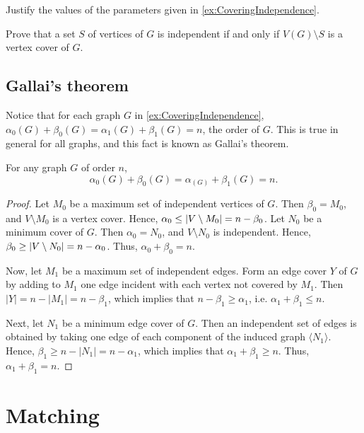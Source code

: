 \begin{Exercise}
Justify the values of the parameters given in \cref{ex:CoveringIndependence}.
\end{Exercise}

\begin{Exercise}
Prove that a set $S$ of vertices of $G$ is independent if and only if $V(G) \setminus S$ is a vertex cover of $G$.
\end{Exercise}

\subsection*{Gallai's theorem}
Notice that for each graph $G$ in \cref{ex:CoveringIndependence}, $\alpha_0(G) + \beta_0(G) = \alpha_1(G) + \beta_1(G) = n$, the order of $G$. This is true in general for all graphs, and this fact is known as Gallai's theorem.

\begin{Theorem}[Gallai]
For any graph $G$ of order $n$,
\begin{equation*}
\alpha_0(G) + \beta_0(G) = \alpha_(G) + \beta_1(G) = n.
\end{equation*}
\end{Theorem}

\begin{proof}
Let $M_0$ be a maximum set of independent vertices of $G$. Then $\beta_0 = M_0$, and $V \setminus M_0$ is a vertex cover. Hence, $\alpha_0 \le \vqty{V \setminus M_0} = n - \beta_0$. Let $N_0$ be a minimum cover of $G$. Then $\alpha_0 = N_0$, and $V \setminus N_0$ is independent. Hence, $\beta_0 \ge \vqty{V \setminus N_0} = n - \alpha_0$. Thus, $\alpha_0 + \beta_0 = n$.

Now, let $M_1$ be a maximum set of independent edges. Form an edge cover $Y$ of $G$ by adding to $M_1$ one edge incident with each vertex not covered by $M_1$. Then $|Y| = n - |M_1| = n - \beta_1$, which implies that $n - \beta_1 \ge \alpha_1$, i.e. $\alpha_1 + \beta_1 \le n$.

Next, let $N_1$ be a minimum edge cover of $G$. Then an independent set of edges is obtained by taking one edge of each component of the induced graph $\langle N_1 \rangle$. Hence, $\beta_1 \ge n - |N_1| = n - \alpha_1$, which implies that $\alpha_1 + \beta_1 \ge n$. Thus, $\alpha_1 + \beta_1 = n$.
\end{proof}


\section{Matching}\label{sec:Matching}

